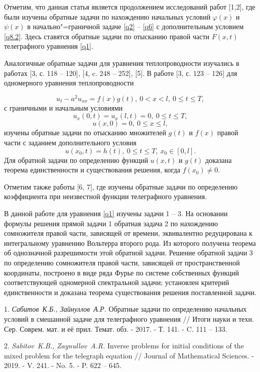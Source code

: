 Отметим, что данная статья является продолжением исследований работ [1,2], где были изучены обратные задачи по нахождению начальных условий $\varphi(x)$ и $\psi(x)$ в начально"=граничной задаче \eqref{q2} -- \eqref{q6} с дополнительным условием \eqref{q8.2}. Здесь ставятся обратные задачи по отысканию правой части $F(x,t)$ телеграфного уравнения \eqref{q1}.

Аналогичные обратные задачи для уравнения теплопроводности изучались в работах [3, с. 118 -- 120], [4, c. 248 -- 252], [5]. В работе [3, с. 123 -- 126] для одномерного уравнения теплопроводности

$$u_t-a^2u_{xx}=f(x)g(t),\ 0<x<l,\ 0\leqslant t\leqslant T,$$
с граничными и начальным условиями
$$u_x(0,t)=u_x(l,t)=0,\ 0\leqslant t\leqslant T,$$
$$u(x,0)=0,\ 0\leqslant x\leqslant l,$$
изучены обратные задачи по отысканию множителей $g(t)$ и $f(x)$ правой части с заданием дополнительного условия
\begin{equation}\label{aa1}u(x_0,t)=h(t),\ 0\leqslant t\leqslant T,\ x_0\in[0,l].\end{equation}
Для обратной задачи по определению функций $u(x,t)$ и $g(t)$ доказана теорема единственности и существования решения, когда $f(x_0)\not=0$.

Отметим также работы [6, 7], где изучены обратные задачи по определению коэффициента при неизвестной функции телеграфного уравнения.

В данной работе для уравнения \eqref{q1} изучены задачи 1 -- 3. На основании формулы решения прямой задачи 1 обратная задача 2 по нахождению сомножителя правой части, зависящей от
времени, эквивалентно редуцирована к интегральному уравнению Вольтерра второго рода. Из которого получена
теорема об однозначной разрешимости этой обратной задачи. Решение обратной задачи 3 по
определению сомножителя правой части, зависящей от пространственной координаты,
построено в виде ряда Фурье по системе собственных функций соответствующей одномерной спектральной задачи; установлен критерий единственности и доказана теорема существования решения поставленной задачи.


\litlist

1. {\it Сабитов~К.Б., Зайнуллов~А.Р.}
 Обратные задачи по определению начальных условий в смешанной задаче для телеграфного уравнения // Итоги науки и техн. Сер. Соврем. мат. и её прил. Темат. обз. - 2017. - Т. 141. - C. 111 -- 133.

2. {\it Sabitov~K.B., Zaynullov~A.R.} Inverse problems for initial conditions of the mixed problem
 for the telegraph equation // Journal of Mathematical Sciences. - 2019. - V. 241. - No. 5. - P. 622 -- 645.

